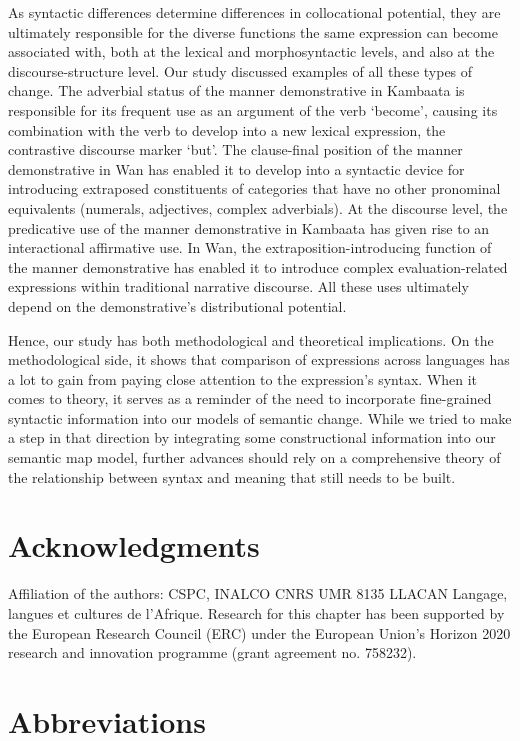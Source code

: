 \documentclass[output=paper,colorlinks,citecolor=brown]{langscibook}
\begin{document}
As syntactic differences determine differences in collocational potential, they are ultimately responsible for the diverse functions the same expression can become associated with, both at the lexical and morphosyntactic levels, and also at the discourse-structure level. Our study discussed examples of all these types of change. The adverbial status of the manner demonstrative in Kambaata is responsible for its frequent use as an argument of the verb ‘become’, causing its combination with the verb to develop into a new lexical expression, the contrastive discourse marker ‘but’. The clause-final position of the manner demonstrative in Wan has enabled it to develop into a syntactic device for introducing extraposed constituents of categories that have no other pronominal equivalents (numerals, adjectives, complex adverbials). At the discourse level, the predicative use of the manner demonstrative in Kambaata has given rise to an interactional affirmative use. In Wan, the extraposition-introducing function of the manner demonstrative has enabled it to introduce complex evaluation-related expressions within traditional narrative discourse. All these uses ultimately depend on the demonstrative’s distributional potential.

Hence, our study has both methodological and theoretical implications. On the methodological side, it shows that comparison of expressions across languages has a lot to gain from paying close attention to the expression’s syntax. When it comes to theory, it serves as a reminder of the need to incorporate fine-grained syntactic information into our models of semantic change. While we tried to make a step in that direction by integrating some constructional information into our semantic map model, further advances should rely on a comprehensive theory of the relationship between syntax and meaning that still needs to be built.

\section*{Acknowledgments}
Affiliation of the authors: CSPC, INALCO CNRS UMR 8135 LLACAN Langage, langues et cultures de l’Afrique. Research for this chapter has been supported by the European Research Council (ERC) under the European Union’s Horizon 2020 research and innovation programme (grant agreement no. 758232).

\section*{Abbreviations}
\end{document}
